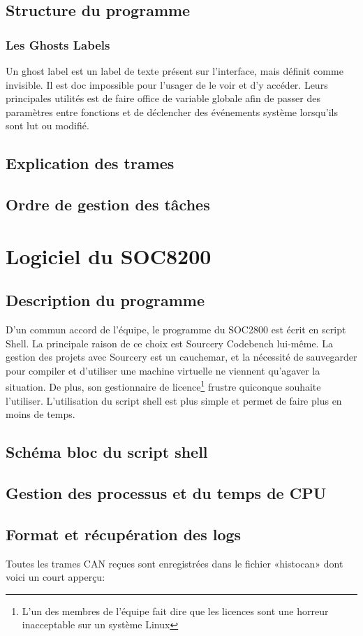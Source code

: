 \documentclass[10pt,a4paper,final]{article}
\begin{document}
\begin{spacing}{1.5}

\subsection{Structure du programme}
\subsubsection{Les Ghosts Labels}
Un ghost label est un label de texte présent sur l'interface, mais définit comme invisible. Il est doc impossible pour l'usager de le voir et d'y accéder. Leurs principales utilités est de faire office de variable globale afin de passer des paramètres entre fonctions et de déclencher des événements système lorsqu'ils sont lut ou modifié.

\subsection{Explication des trames}

\subsection{Ordre de gestion des tâches}





\pagebreak
\section{Logiciel du SOC8200}
\subsection{Description du programme}
D'un commun accord de l'équipe, le programme du SOC2800 est écrit en script Shell. La principale raison de ce choix est Sourcery Codebench lui-même. La gestion des projets avec Sourcery est un cauchemar, et la nécessité de sauvegarder pour compiler et d'utiliser une machine virtuelle ne viennent qu'agaver la situation. De plus, son gestionnaire de licence\footnote{L'un des membres de l'équipe fait dire que les licences sont une horreur inacceptable sur un système Linux} frustre quiconque souhaite l'utiliser. L'utilisation du script shell est plus simple et permet de faire plus en moins de temps.

\subsection{Schéma bloc du script shell}

\subsection{Gestion des processus et du temps de CPU}

\subsection{Format et récupération des logs}

Toutes les trames CAN reçues sont enregistrées dans le fichier «histocan» dont voici un court apperçu:
\end{spacing}
\end{document}
